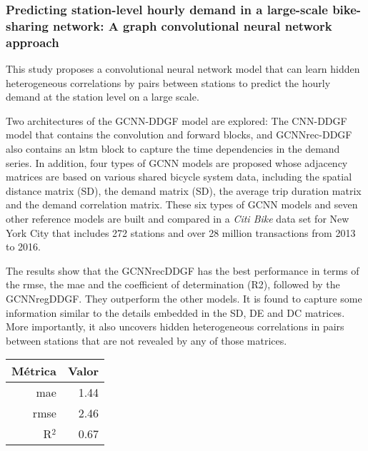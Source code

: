 \subsubsection{Predicting station-level hourly demand in a large-scale bike-sharing network: A graph convolutional neural network approach}

This study proposes a convolutional \cite{LIN2018258} neural network model that can learn hidden heterogeneous correlations by pairs between stations to predict the hourly demand at the station level on a large scale.
\newline

Two architectures of the GCNN-DDGF model are explored: The CNN-DDGF model that contains the convolution and forward blocks, and GCNNrec-DDGF also contains an \acrshort{lstm} block to capture the time dependencies in the demand series. In addition, four types of GCNN models are proposed whose adjacency matrices are based on various shared bicycle system data, including the spatial distance matrix (SD), the demand matrix (SD), the average trip duration matrix and the demand correlation matrix. These six types of GCNN models and seven other reference models are built and compared in a \textit{Citi Bike} data set for New York City that includes 272 stations and over 28 million transactions from 2013 to 2016.
\newline

The results show that the GCNNrecDDGF has the best performance in terms of the \acrshort{rmse}, the \acrshort{mae} and the coefficient of determination (R2), followed by the GCNNregDDGF. They outperform the other models. It is found to capture some information similar to the details embedded in the SD, DE and DC matrices. More importantly, it also uncovers hidden heterogeneous correlations in pairs between stations that are not revealed by any of those matrices.

\begin{table}[H]
\centering
\begin{tabular}{rr}
\toprule
 Métrica & Valor \\
\midrule
 \acrshort{mae} &  1.44 \\
 \acrshort{rmse} &  2.46 \\
 R$^2$ &  0.67 \\
\bottomrule
\end{tabular}
\end{table}